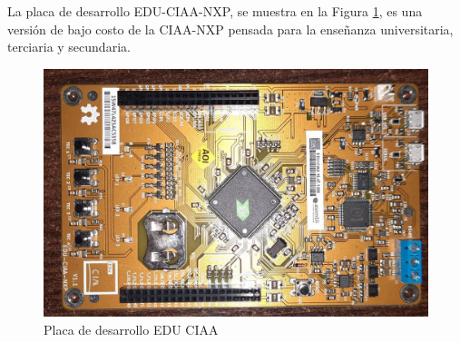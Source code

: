 La placa de desarrollo EDU-CIAA-NXP, se muestra en la Figura \ref{fig:EduCiaaPlaca}, es una versión de bajo costo de la CIAA-NXP \cite{proyectoCIAA} pensada para la enseñanza universitaria, terciaria y secundaria. 
\begin{figure}[H]
    \centering
    \includegraphics[width=0.7\linewidth]{Figuras/datalogger/Hardware/EduCiaaPlaca.jpg}
    \caption{Placa de desarrollo EDU CIAA}
    \label{fig:EduCiaaPlaca}
\end{figure}



  
  
